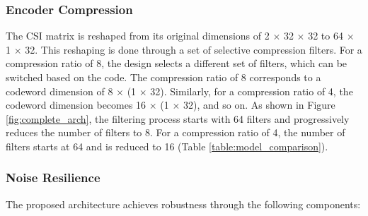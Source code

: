 \documentclass[lettersize,journal]{IEEEtran}
\begin{document}
\subsubsection{Encoder Compression}
The CSI matrix is reshaped from its original dimensions of 2 \begin{math} \times \end{math} 32 \begin{math} \times \end{math} 32 to 64 \begin{math} \times \end{math} 1 \begin{math} \times \end{math} 32. This reshaping is done through a set of selective compression filters. For a compression ratio of 8, the design selects a different set of filters, which can be switched based on the code. The compression ratio of 8 corresponds to a codeword dimension of 8 \begin{math} \times \end{math} (1 \begin{math} \times \end{math} 32). Similarly, for a compression ratio of 4, the codeword dimension becomes 16 \begin{math} \times \end{math} (1 \begin{math} \times \end{math} 32), and so on.
As shown in Figure \ref{fig:complete_arch}, the filtering process starts with 64 filters and progressively reduces the number of filters to 8. For a compression ratio of 4, the number of filters starts at 64 and is reduced to 16 (Table \ref{table:model_comparison}).

\subsubsection{Noise Resilience} 
\label{subsubsec:noise_resilience}


The proposed architecture achieves robustness through the following components:
\end{document}
